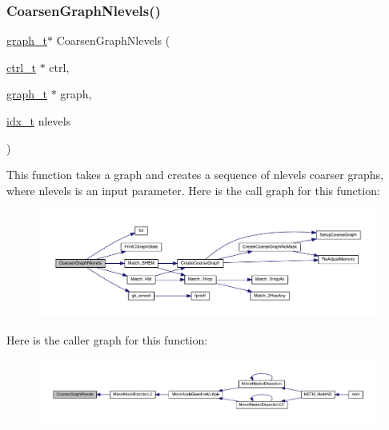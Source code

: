 \subsubsection{\texorpdfstring{Coarsen\+Graph\+Nlevels()}{CoarsenGraphNlevels()}}
{\footnotesize\ttfamily \hyperlink{a00734}{graph\+\_\+t}$\ast$ Coarsen\+Graph\+Nlevels (\begin{DoxyParamCaption}\item[{\hyperlink{a00742}{ctrl\+\_\+t} $\ast$}]{ctrl,  }\item[{\hyperlink{a00734}{graph\+\_\+t} $\ast$}]{graph,  }\item[{\hyperlink{a00876_aaa5262be3e700770163401acb0150f52}{idx\+\_\+t}}]{nlevels }\end{DoxyParamCaption})}

This function takes a graph and creates a sequence of nlevels coarser graphs, where nlevels is an input parameter. Here is the call graph for this function\+:\nopagebreak
\begin{figure}[H]
\begin{center}
\leavevmode
\includegraphics[width=350pt]{a00945_afa83320e3b311e0feef90d0bf4303716_cgraph}
\end{center}
\end{figure}
Here is the caller graph for this function\+:\nopagebreak
\begin{figure}[H]
\begin{center}
\leavevmode
\includegraphics[width=350pt]{a00945_afa83320e3b311e0feef90d0bf4303716_icgraph}
\end{center}
\end{figure}
\mbox{\label{a00945_aa4d0e5c89a60679b517deddad368b686}} 

